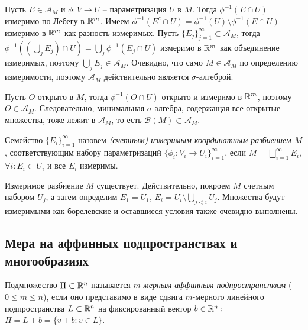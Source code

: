 \begin{myproof}
	Пусть $E \in \mathcal{A}_M$ и $\phi : V \to U$ -- параметризация $U$ в $M$. 
	Тогда $\phi^{-1}(E \cap U)$ измеримо по Лебегу в $\mathbb{R}^m$.
	Имеем $\phi^{-1}(E^c \cap U) = \phi^{-1}(U) \setminus \phi^{-1}(E \cap U)$ измеримо в $\mathbb{R}^m$ как разность измеримых.
	Пусть $\{E_j\}_{j=1}^{\infty} \subset \mathcal{A}_M$, тогда $\phi^{-1}((\bigcup_j E_j) \cap U) = \bigcup_j \phi^{-1}( E_j \cap U)$ измеримо в $\mathbb{R}^m$ как объединение измеримых, поэтому $\bigcup_j E_j \in \mathcal{A}_M$.
	Очевидно, что само $M \in \mathcal{A}_M$ по определению измеримости, поэтому $\mathcal{A}_M$ действительно является $\sigma$-алгеброй.

	\vspace{5pt}
	Пусть $O$ открыто в $M$, тогда $\phi^{-1}(O \cap U)$ открыто и измеримо в $\mathbb{R}^m$, поэтому $O \in \mathcal{A}_M$.
	Следовательно, минимальная $\sigma$-алгебра, содержащая все открытые множества, тоже лежит в $\mathcal{A}_M$, то есть $\mathcal{B}(M) \subset \mathcal{A}_M$.
\end{myproof}

\begin{definition}
	Семейство $\{E_i\}_{i=1}^{\infty}$ назовем \textit{(счетным) измеримым координатным разбиением $M$}, соответствующим набору параметризаций $\{\phi_i : V_i \to U_i\}_{i=1}^{\infty}$, если $M = \bigsqcup \limits_{i=1}^{\infty} E_i$, $\forall i : E_i \subset U_i$ и все $E_i$ измеримы.
\end{definition}

\begin{note}
	Измеримое разбиение $M$ существует. Действительно, покроем $M$ счетным набором $U_j$, а затем определим $E_1 = U_1$, $E_i = U_i \setminus \bigcup_{j < i} U_j$. 
	Множества будут измеримыми как борелевские и оставшиеся условия также очевидно выполнены.
\end{note}



\subsection{Мера на аффинных подпространствах и многообразиях}

\begin{definition}
	Подмножество $\Pi \subset \mathbb{R}^n$ называется \textit{$m$-мерным аффинным подпространством} ($0 \leq m \leq n$), если оно представимо в виде сдвига $m$-мерного линейного подпространства $L \subset \mathbb{R}^n$ на фиксированный вектор $b \in \mathbb{R}^n:$
	$ \Pi = L + b = \{v + b : v \in L\}$. 
\end{definition}

